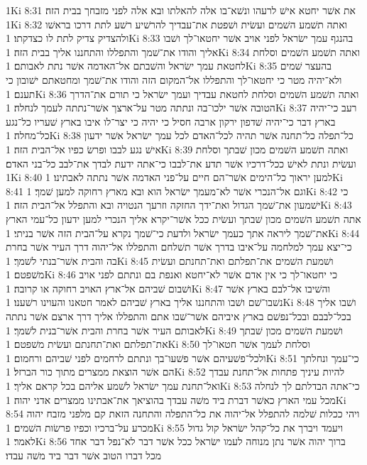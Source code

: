 1Ki 8:31  את אשׁר יחטא אישׁ לרעהו ונשׁא־בו אלה להאלתו ובא אלה לפני מזבחך בבית הזה׃
1Ki 8:32  ואתה תשׁמע השׁמים ועשׂית ושׁפטת את־עבדיך להרשׁיע רשׁע לתת דרכו בראשׁו ולהצדיק צדיק לתת לו כצדקתו׃
1Ki 8:33  בהנגף עמך ישׂראל לפני אויב אשׁר יחטאו־לך ושׁבו אליך והודו את־שׁמך והתפללו והתחננו אליך בבית הזה׃
1Ki 8:34  ואתה תשׁמע השׁמים וסלחת לחטאת עמך ישׂראל והשׁבתם אל־האדמה אשׁר נתת לאבותם׃
1Ki 8:35  בהעצר שׁמים ולא־יהיה מטר כי יחטאו־לך והתפללו אל־המקום הזה והודו את־שׁמך ומחטאתם ישׁובון כי תענם׃
1Ki 8:36  ואתה תשׁמע השׁמים וסלחת לחטאת עבדיך ועמך ישׂראל כי תורם את־הדרך הטובה אשׁר ילכו־בה ונתתה מטר על־ארצך אשׁר־נתתה לעמך לנחלה׃
1Ki 8:37  רעב כי־יהיה בארץ דבר כי־יהיה שׁדפון ירקון ארבה חסיל כי יהיה כי יצר־לו איבו בארץ שׁעריו כל־נגע כל־מחלה׃
1Ki 8:38  כל־תפלה כל־תחנה אשׁר תהיה לכל־האדם לכל עמך ישׂראל אשׁר ידעון אישׁ נגע לבבו ופרשׂ כפיו אל־הבית הזה׃
1Ki 8:39  ואתה תשׁמע השׁמים מכון שׁבתך וסלחת ועשׂית ונתת לאישׁ ככל־דרכיו אשׁר תדע את־לבבו כי־אתה ידעת לבדך את־לבב כל־בני האדם׃
1Ki 8:40  למען יראוך כל־הימים אשׁר־הם חיים על־פני האדמה אשׁר נתתה לאבתינו׃
1Ki 8:41  וגם אל־הנכרי אשׁר לא־מעמך ישׂראל הוא ובא מארץ רחוקה למען שׁמך׃
1Ki 8:42  כי ישׁמעון את־שׁמך הגדול ואת־ידך החזקה וזרעך הנטויה ובא והתפלל אל־הבית הזה׃
1Ki 8:43  אתה תשׁמע השׁמים מכון שׁבתך ועשׂית ככל אשׁר־יקרא אליך הנכרי למען ידעון כל־עמי הארץ את־שׁמך ליראה אתך כעמך ישׂראל ולדעת כי־שׁמך נקרא על־הבית הזה אשׁר בניתי׃
1Ki 8:44  כי־יצא עמך למלחמה על־איבו בדרך אשׁר תשׁלחם והתפללו אל־יהוה דרך העיר אשׁר בחרת בה והבית אשׁר־בנתי לשׁמך׃
1Ki 8:45  ושׁמעת השׁמים את־תפלתם ואת־תחנתם ועשׂית משׁפטם׃
1Ki 8:46  כי יחטאו־לך כי אין אדם אשׁר לא־יחטא ואנפת בם ונתתם לפני אויב ושׁבום שׁביהם אל־ארץ האויב רחוקה או קרובה׃
1Ki 8:47  והשׁיבו אל־לבם בארץ אשׁר נשׁבו־שׁם ושׁבו והתחננו אליך בארץ שׁביהם לאמר חטאנו והעוינו רשׁענו׃
1Ki 8:48  ושׁבו אליך בכל־לבבם ובכל־נפשׁם בארץ איביהם אשׁר־שׁבו אתם והתפללו אליך דרך ארצם אשׁר נתתה לאבותם העיר אשׁר בחרת והבית אשׁר־בנית לשׁמך׃
1Ki 8:49  ושׁמעת השׁמים מכון שׁבתך את־תפלתם ואת־תחנתם ועשׂית משׁפטם׃
1Ki 8:50  וסלחת לעמך אשׁר חטאו־לך ולכל־פשׁעיהם אשׁר פשׁעו־בך ונתתם לרחמים לפני שׁביהם ורחמום׃
1Ki 8:51  כי־עמך ונחלתך הם אשׁר הוצאת ממצרים מתוך כור הברזל׃
1Ki 8:52  להיות עיניך פתחות אל־תחנת עבדך ואל־תחנת עמך ישׂראל לשׁמע אליהם בכל קראם אליך׃
1Ki 8:53  כי־אתה הבדלתם לך לנחלה מכל עמי הארץ כאשׁר דברת ביד משׁה עבדך בהוציאך את־אבתינו ממצרים אדני יהוה׃
1Ki 8:54  ויהי ככלות שׁלמה להתפלל אל־יהוה את כל־התפלה והתחנה הזאת קם מלפני מזבח יהוה מכרע על־ברכיו וכפיו פרשׂות השׁמים׃
1Ki 8:55  ויעמד ויברך את כל־קהל ישׂראל קול גדול לאמר׃
1Ki 8:56  ברוך יהוה אשׁר נתן מנוחה לעמו ישׂראל ככל אשׁר דבר לא־נפל דבר אחד מכל דברו הטוב אשׁר דבר ביד משׁה עבדו׃
